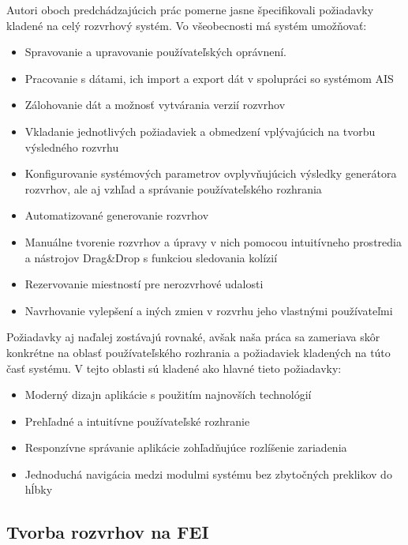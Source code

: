Autori oboch predchádzajúcich prác pomerne jasne špecifikovali požiadavky kladené na celý
rozvrhový systém. Vo všeobecnosti má systém umožňovať:

\begin{itemize}
\item Spravovanie a upravovanie používateľských oprávnení.
\item Pracovanie s dátami, ich import a export dát v spolupráci so systémom AIS
\item Zálohovanie dát a možnosť vytvárania verzií rozvrhov
\item Vkladanie jednotlivých požiadaviek a obmedzení vplývajúcich na tvorbu výsledného rozvrhu
\item Konfigurovanie systémových parametrov ovplyvňujúcich výsledky generátora rozvrhov,
ale aj vzhľad a správanie používateľského rozhrania
\item Automatizované generovanie rozvrhov
\item Manuálne tvorenie rozvrhov a úpravy v nich pomocou intuitívneho prostredia a nástrojov 
Drag\&Drop s funkciou sledovania kolízií
\item Rezervovanie miestností pre nerozvrhové udalosti
\item Navrhovanie vylepšení a iných zmien v rozvrhu jeho vlastnými používateľmi
\end{itemize}

Požiadavky aj naďalej zostávajú rovnaké, avšak naša práca sa zameriava skôr konkrétne
na oblasť používateľského rozhrania a požiadaviek kladených na túto časť systému. 
V tejto oblasti sú kladené ako hlavné tieto požiadavky:

\begin{itemize}
\item Moderný dizajn aplikácie s použitím najnovších technológií
\item Prehľadné a intuitívne používateľské rozhranie
\item Responzívne správanie aplikácie zohľadňujúce rozlíšenie zariadenia
\item Jednoduchá navigácia medzi modulmi systému bez zbytočných preklikov do hĺbky
\end{itemize}
\subsection{Tvorba rozvrhov na FEI}
\label{subsec:fei_timetabling}

